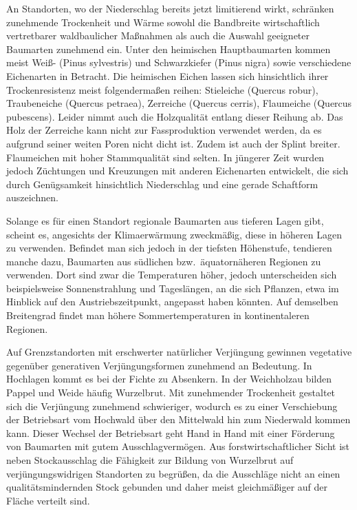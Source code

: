 \documentclass[twocolumn]{scrartcl}
\begin{document}
An Standorten, wo der Niederschlag bereits jetzt limitierend wirkt,
schränken zunehmende
Trockenheit und Wärme sowohl die Bandbreite wirtschaftlich
vertretbarer waldbaulicher Maßnahmen als auch die Auswahl geeigneter
Baumarten zunehmend ein. Unter den heimischen Hauptbaumarten kommen
meist Weiß- (Pinus sylvestris) und Schwarzkiefer (Pinus
nigra) sowie verschiedene Eichenarten in Betracht.
Die heimischen Eichen lassen sich hinsichtlich ihrer Trockenresistenz
meist folgendermaßen reihen:
Stieleiche (Quercus robur), Traubeneiche (Quercus petraea),
Zerreiche (Quercus cerris), Flaumeiche (Quercus pubescens). Leider
nimmt auch die Holzqualität entlang dieser Reihung ab. Das Holz der
Zerreiche kann nicht zur Fassproduktion verwendet werden, da es
aufgrund seiner weiten Poren nicht dicht ist. Zudem ist auch der
Splint breiter.
Flaumeichen mit hoher Stammqualität sind selten. In jüngerer Zeit
wurden jedoch Züchtungen und Kreuzungen mit anderen Eichenarten
entwickelt, die sich durch Genügsamkeit hinsichtlich Niederschlag und eine
gerade Schaftform auszeichnen.

Solange es für einen Standort regionale Baumarten aus tieferen Lagen gibt,
scheint es, angesichts der Klimaerwärmung zweckmäßig, diese in höheren Lagen zu
verwenden. Befindet man sich jedoch in der tiefsten Höhenstufe, tendieren manche
dazu, Baumarten aus südlichen bzw.\ äquatornäheren Regionen zu verwenden.
Dort sind zwar die Temperaturen höher, jedoch unterscheiden sich beispielsweise Sonnenstrahlung und Tageslängen, an die sich Pflanzen, etwa im Hinblick auf den Austriebszeitpunkt, angepasst haben könnten.
Auf demselben Breitengrad findet man höhere
Sommertemperaturen in kontinentaleren Regionen.

Auf Grenzstandorten mit erschwerter natürlicher Verjüngung gewinnen vegetative
gegenüber generativen Verjüngungsformen zunehmend an Bedeutung.
In Hochlagen kommt es bei der Fichte zu Absenkern.
In der Weichholzau bilden Pappel und Weide häufig Wurzelbrut.
Mit zunehmender Trockenheit gestaltet sich die Verjüngung zunehmend
schwieriger, wodurch es zu einer Verschiebung der Betriebsart vom
Hochwald über den Mittelwald hin zum Niederwald kommen kann.
Dieser Wechsel der Betriebsart geht Hand in Hand mit einer Förderung
von Baumarten mit gutem Ausschlagvermögen.
Aus forstwirtschaftlicher Sicht ist
neben Stockausschlag die Fähigkeit zur Bildung von Wurzelbrut auf
verjüngungswidrigen Standorten zu begrüßen, da die Ausschläge nicht an einen
qualitätsmindernden Stock gebunden und daher meist gleichmäßiger auf der Fläche
verteilt sind.
\end{document}
